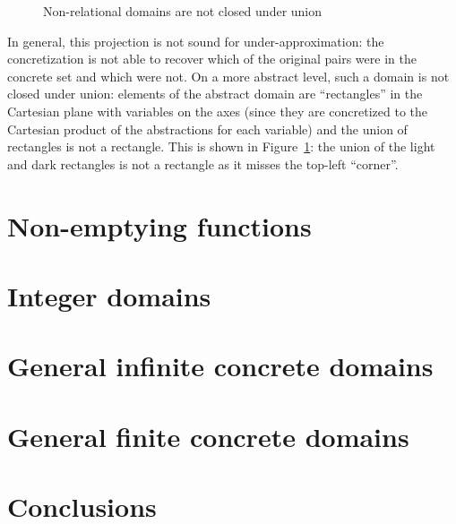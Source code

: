 \begin{example}
	\begin{figure}[t]
		\centering
		{
			\fontsize{11pt}{13pt}\selectfont
			\def\svgwidth{3in}
			
		}
		\caption{Non-relational domains are not closed under union}
		\label{fig:uai:rel-domain}
	\end{figure}
	In general, this projection is not sound for under-approximation: the concretization is not able to recover which of the original pairs were in the concrete set and which were not. On a more abstract level, such a domain is not closed under union: elements of the abstract domain are ``rectangles'' in the Cartesian plane with variables on the axes (since they are concretized to the Cartesian product of the abstractions for each variable) and the union of rectangles is not a rectangle. This is shown in Figure~\ref{fig:uai:rel-domain}: the union of the light and dark rectangles is not a rectangle as it misses the top-left ``corner''.
\end{example}

\section{Non-emptying functions}
\fromhere

\section{Integer domains}

\section{General infinite concrete domains}

\section{General finite concrete domains}

\section{Conclusions}
